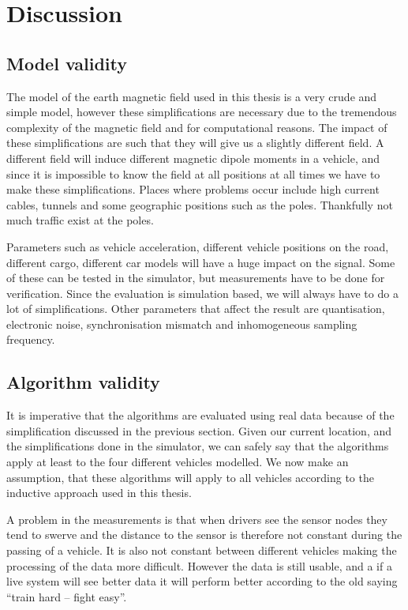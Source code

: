 \cleardoublepage\chapter{Discussion}\label{chap:discussion}

\section{Model validity}
The model of the earth magnetic field used in this thesis is a very crude and simple model, however these simplifications are necessary due to the tremendous complexity of the magnetic field and for computational reasons. The impact of these simplifications are such that they will give us a slightly different field. A different field will induce different magnetic dipole moments in a vehicle, and since it is impossible to know the field at all positions at all times we have to make these simplifications. Places where problems occur include high current cables, tunnels and some geographic positions such as the poles. Thankfully not much traffic exist at the poles.

Parameters such as vehicle acceleration, different vehicle positions on the road, different cargo, different car models will have a huge impact on the signal. Some of these can be tested in the simulator, but measurements have to be done for verification. Since the evaluation is simulation based, we will always have to do a lot of simplifications. Other parameters that affect the result are quantisation, electronic noise, synchronisation mismatch and inhomogeneous sampling frequency.

\section{Algorithm validity}
It is imperative that the algorithms are evaluated using real data because of the simplification discussed in the previous section. Given our current location, and the simplifications done in the simulator, we can safely say that the algorithms apply at least to the four different vehicles modelled. We now make an assumption, that these algorithms will apply to all vehicles according to the inductive approach used in this thesis.

A problem in the measurements is that when drivers see the sensor nodes they tend to swerve and the distance to the sensor is therefore not constant during the passing of a vehicle. It is also not constant between different vehicles making the processing of the data more difficult. However the data is still usable, and a if a live system will see better data it will perform better according to the old saying ``train hard -- fight easy''.